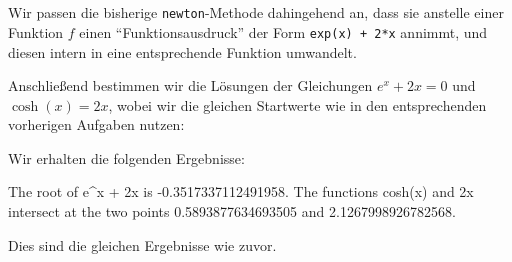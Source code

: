 \section{}

Wir passen die bisherige \texttt{newton}-Methode dahingehend an, dass sie anstelle einer Funktion $f$ einen \enquote{Funktionsausdruck} der Form \texttt{exp(x) + 2*x} annimmt, und diesen intern in eine entsprechende Funktion umwandelt.



Anschließend bestimmen wir die Lösungen der Gleichungen $e^x + 2x = 0$ und $\cosh(x) = 2x$, wobei wir die gleichen Startwerte wie in den entsprechenden vorherigen Aufgaben nutzen:



Wir erhalten die folgenden Ergebnisse:

\begin{consoleoutput}
The root of e^x + 2x is -0.3517337112491958.
The functions cosh(x) and 2x intersect at the two points 0.5893877634693505 and 2.1267998926782568.
\end{consoleoutput}

Dies sind die gleichen Ergebnisse wie zuvor.

